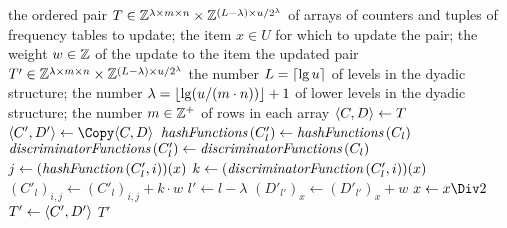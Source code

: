 \begin{algorithmic}[1]
  \In the ordered pair \( \cramped{T \in \integers^{\lambda \times m \times n} \times \integers^{(L - \lambda) \times u / 2^{\lambda}}} \) of arrays of counters and tuples of frequency tables to update; the item \( x \in U \) for which to update the pair; the weight \( w \in \mathbb{Z} \) of the update to the item
  \Out the updated pair \( \cramped{T' \in \integers^{\lambda \times m \times n} \times \integers^{(L - \lambda) \times u / 2^{\lambda}}} \)
  \Constant the number \( L = \lceil\lg u\rceil \) of levels in the dyadic structure; the number \( \lambda = \lfloor\lg (u / (m \cdot n))\rfloor + 1 \) of lower levels in the dyadic structure; the number \( m \in \mathbb{Z}^{+} \) of rows in each array
    \State \( \langle C, D\rangle \gets T \)
    \State \( \datasequence{C', D'} \gets \Copy \datasequence{C, D} \)
        \State \( \hashFunctions (C'_{l}) \gets \hashFunctions (C_{l}) \)
        \State \( \discriminatorFunctions (C'_{l}) \gets \discriminatorFunctions (C_{l}) \)
          \State \( j \gets (\hashFunction (C'_{l}, i))(x) \)
          \State \( k \gets (\discriminatorFunction (C'_{l}, i))(x) \)
          \State \( (C'_{l})_{i, j} \gets (C'_{l})_{i, j} + k \cdot w \)
        \EndFor
      \Else
        \State \( l' \gets l - \lambda \)
        \State \( (D'_{l'})_{x} \gets (D'_{l'})_{x} + w \)
      \EndIf
      \State \( x \gets x \Div 2 \)
    \EndFor
    \State \( T' \gets \langle C', D'\rangle \)
    \State \Return \( T' \)
  \EndFunction
\end{algorithmic}
